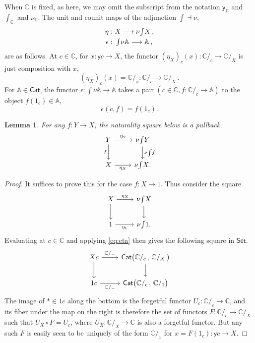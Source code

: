 \documentclass[11pt]{article}
\newcommand{\C}{\ensuremath{\mathbb{C}}}
\newcommand{\A}{\ensuremath{\mathbb{A}}}
\newcommand{\Set}{\ensuremath{\mathsf{Set}}}
\newcommand{\Cat}{\ensuremath{\mathsf{Cat}}}
\newcommand{\y}{\ensuremath{\mathsf{y}}} %
\newcommand{\yon}{\ensuremath{\mathsf{y}}} %
\newcommand{\ra}{\ensuremath{\rightarrow}}
\renewcommand{\to}{\ensuremath{\rightarrow}}
\newcommand{\too}{\ensuremath{\longrightarrow}}
\newcommand{\elem}[1]{\textstyle\int\!{#1}}
\newtheorem{lemma}[theorem]{Lemma}
\theoremstyle{remark}
\theoremstyle{definition}
\begin{document}
When $\C$ is fixed, as here, we may omit the subscript from the notation $\yon_\C$ and  $\int_\C$ and $\nu_\C$.  The unit and counit maps of the adjunction $\int \dashv \nu$,
\begin{align*}\textstyle
\eta :&\ \textstyle  X \too \nu{\elem{X}}\,, \\
\epsilon :&\ \textstyle  \elem\nu\A \too \A\,,
\end{align*}
 are as follows.  At $c\in\C$, for $x : \y{c}\ra X$, the functor $(\eta_X)_c(x) : \C/_c \to \C/_X$ is just composition with $x$, 
\begin{equation}\label{eq:eta}
(\eta_X)_c(x) = \C/_x : \C/_c \too \C/_X\,.
\end{equation}
For $\A\in\Cat$, the functor $ \epsilon : \int\nu\A \to \A$ takes a pair $(c\in\C, f : \C/_c \to \A)$ to the object $f(1_c) \in \A$,
\[
\epsilon(c,f) = f(1_c).
\]
\begin{lemma}\label{lemma:natpb}
For any $f : Y\to X$, the naturality square below is a pullback.
\begin{equation}\label{eq:naturality}\textstyle
\begin{tikzcd}
	 Y \ar[d, swap,"f"] \ar[r, "{\eta_Y}"] & \nu{\int\!{Y}} \ar[d, "{ \nu{\int\!{f}}}"]\\  
	X \ar[r, swap,"{\eta_X}"] &   \nu{\int\!{X}}.
 \end{tikzcd}
 \end{equation}
\end{lemma}

\begin{proof}
It suffices to prove this for the case $f : X\ra 1$.  Thus consider the square 
\begin{equation}\label{eq:naturalityobject}\textstyle
\begin{tikzcd}
	 X \ar[d] \ar[r, "{\eta_X}"] & \nu{\int\!{X}} \ar[d]\\  
	1\ar[r, swap,"{\eta_1}"] &   \nu{\int\! 1}.
 \end{tikzcd}
 \end{equation}
Evaluating at $c\in\C$ and applying \eqref{eq:eta} then gives the following square in $\Set$.
\begin{equation}\label{eq:naturalityobjecteval}\textstyle
\begin{tikzcd}
	 Xc \ar[d] \ar[r, "{\C/_{-}}"] & \Cat\big( {\C/_c}\,,\, {\C/_X}\, \big) \ar[d]\\  
	1c\ar[r, swap, "{\C/_{-}}"] &   \Cat\big( {\C/_c}\,,\, \C/_1 \big)
 \end{tikzcd}
 \end{equation}
The image of $*\in 1c$ along the bottom is the forgetful functor $U_c : \C/_c\to \C$, and its fiber under the map on the right is therefore the set of functors $F : {\C/_c}\to {\C/_X}$ such that $U_X\circ F = U_c$, where $U_X : \C/_X\to \C$ is also a forgetful functor. But any such $F$ is easily seen to be uniquely of the form $\C/_{x}$ for $x = F(1_c) : \y{c} \to X$.
\end{proof}
\end{document}
